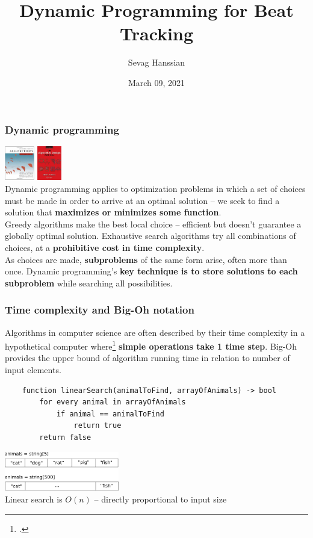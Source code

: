 \documentclass{beamer}
\title{Dynamic Programming for Beat Tracking}
\author{Sevag Hanssian}
\date{March 09, 2021}
\institute{MUMT 621, Winter 2021}
\begin{document}
\begin{frame}
\maketitle
\end{frame}

\begin{frame}
	\frametitle{Dynamic programming}
	\vspace{0.5em}
	\includegraphics[height=1.5cm]{./clrs.jpg} \includegraphics[height=1.5cm]{./skiena.jpg}\\
	Dynamic programming applies to optimization problems in which a set of choices must be made in order to arrive at an optimal solution -- we seek to find a solution that \textbf{maximizes or minimizes some function}.\\
	\vspace{0.25em}
	Greedy algorithms make the best local choice -- efficient but doesn't guarantee a globally optimal solution. Exhaustive search algorithms try all combinations of choices, at a \textbf{prohibitive cost in time complexity}.\\
	\vspace{0.25em}
	As choices are made, \textbf{subproblems} of the same form arise, often more than once. Dynamic programming's \textbf{key technique is to store solutions to each subproblem} while searching all possibilities.
\end{frame}

\begin{frame}[fragile]
	\frametitle{Time complexity and Big-Oh notation}
	Algorithms in computer science are often described by their time complexity in a hypothetical computer where\footcite{skiena} \textbf{simple operations take 1 time step}. Big-Oh provides the upper bound of algorithm running time in relation to number of input elements.
	\begin{verbatim}
	function linearSearch(animalToFind, arrayOfAnimals) -> bool
	    for every animal in arrayOfAnimals
	        if animal == animalToFind
	            return true
	    return false
	\end{verbatim}
	\includegraphics[width=5cm]{./linearsearch.png}\\
	Linear search is $O(n)$ -- directly proportional to input size
\end{frame}
\end{document}

